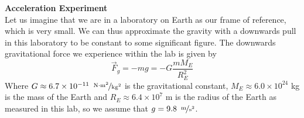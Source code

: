 \documentclass{article}
\begin{document}
 		\begin{exmp}
 			\textbf{Acceleration Experiment} \\
 			Let us imagine that we are in a laboratory on Earth as our frame of reference, which is very small. We can thus approximate the gravity with a downwards pull in this laboratory to be constant to some significant figure. The downwards gravitational force we experience within the lab is given by
 			$$ \vec{F}_g = -m g = - G \frac{mM_E}{R_E^2}$$
 			Where $G \approx 6.7 \times 10^{-11}\,\,\, \nicefrac{\text{N$\cdot$m}^2}{\text{kg}^2}$ is the gravitational constant, $M_E \approx 6.0\times 10^{24}$ kg is the mass of the Earth and $R_E \approx 6.4 \times 10^7$ m is the radius of the Earth as measured in this lab, so we assume that $g = 9.8 \,\,\, \nicefrac{\text{m}}{\text{s}^2}$.
 			\pagebreak
 			

\end{exmp}
\end{document}
